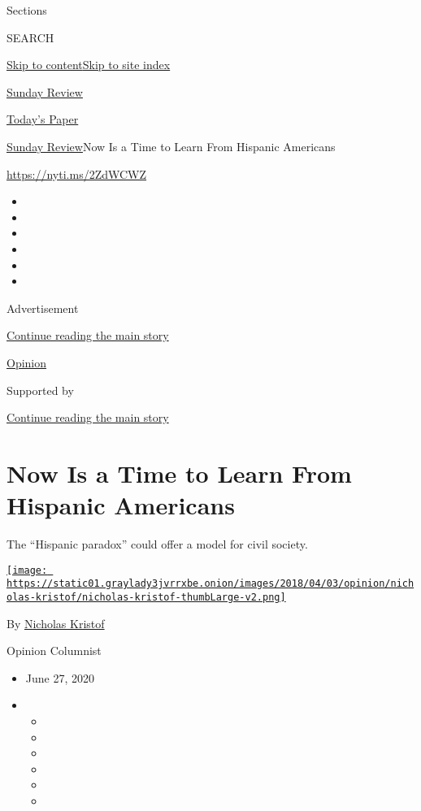 Sections

SEARCH

\protect\hyperlink{site-content}{Skip to
content}\protect\hyperlink{site-index}{Skip to site index}

\href{https://www.nytimes3xbfgragh.onion/section/opinion/sunday}{Sunday
Review}

\href{https://myaccount.nytimes3xbfgragh.onion/auth/login?response_type=cookie\&client_id=vi}{}

\href{https://www.nytimes3xbfgragh.onion/section/todayspaper}{Today's
Paper}

\href{/section/opinion/sunday}{Sunday Review}\textbar{}Now Is a Time to
Learn From Hispanic Americans

\url{https://nyti.ms/2ZdWCWZ}

\begin{itemize}
\item
\item
\item
\item
\item
\item
\end{itemize}

Advertisement

\protect\hyperlink{after-top}{Continue reading the main story}

\href{/section/opinion}{Opinion}

Supported by

\protect\hyperlink{after-sponsor}{Continue reading the main story}

\hypertarget{now-is-a-time-to-learn-from-hispanic-americans}{%
\section{Now Is a Time to Learn From Hispanic
Americans}\label{now-is-a-time-to-learn-from-hispanic-americans}}

The ``Hispanic paradox'' could offer a model for civil society.

\href{https://www.nytimes3xbfgragh.onion/column/nicholas-kristof}{\texttt{[image: https://static01.graylady3jvrrxbe.onion/images/2018/04/03/opinion/nicholas-kristof/nicholas-kristof-thumbLarge-v2.png]}}

By
\href{https://www.nytimes3xbfgragh.onion/column/nicholas-kristof}{Nicholas
Kristof}

Opinion Columnist

\begin{itemize}
\item
  June 27, 2020
\item
  \begin{itemize}
  \item
  \item
  \item
  \item
  \item
  \item
  \end{itemize}
\end{itemize}

